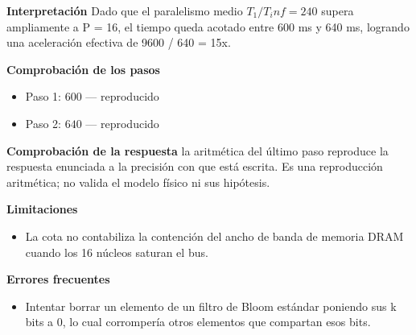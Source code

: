 \documentclass{book}
\begin{document}
\begin{tcolorbox}[title={Problema resuelto}, studiumworked, breakable]
\noindent\textbf{Interpretación}
Dado que el paralelismo medio \(T_1 / T_inf = 240\) supera ampliamente a P = 16, el tiempo queda acotado entre 600 ms y 640 ms, logrando una aceleración efectiva de 9600 / 640 = 15x.

\noindent\textbf{Comprobación de los pasos}
\begin{itemize}
\item Paso 1: $600$ — reproducido
\item Paso 2: $640$ — reproducido
\end{itemize}

\noindent\textbf{Comprobación de la respuesta} la aritmética del último paso reproduce la respuesta enunciada a la precisión con que está escrita. Es una reproducción aritmética; no valida el modelo físico ni sus hipótesis.

\noindent\textbf{Limitaciones}
\begin{itemize}
\item La cota no contabiliza la contención del ancho de banda de memoria DRAM cuando los 16 núcleos saturan el bus.
\end{itemize}

\noindent\textbf{Errores frecuentes}
\begin{itemize}
\item Intentar borrar un elemento de un filtro de Bloom estándar poniendo sus k bits a 0, lo cual corrompería otros elementos que compartan esos bits.
\end{itemize}
\end{tcolorbox}
\end{document}
